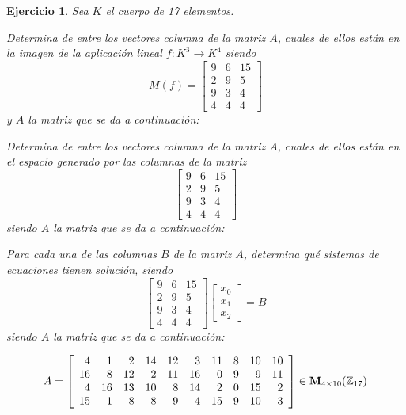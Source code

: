 \documentclass[12pt]{amsart}
\newtheorem{ejer}{Ejercicio}
\begin{document}
\begin{ejer} Sea $K$ el cuerpo de 17 elementos.
\newline
\noindent\begin{minipage}{\textwidth}
\begin{tcolorbox}[colback = green!20!white,title=Versión Núcleo]
Determina de entre los vectores columna de la matriz $A$, cuales de ellos están en la imagen de la aplicación lineal $f:K^{3} \to K^{4}$ siendo  $$ M(f) = \left[\begin{array}{rrr}
9 & 6 & 15 \\
2 & 9 & 5 \\
9 & 3 & 4 \\
4 & 4 & 4
\end{array}\right] $$ y $A$ la matriz que se da a continuación:\end{tcolorbox}
\end{minipage} \newline
\noindent\begin{minipage}{\textwidth}
\begin{tcolorbox}[colback = blue!20!white,title=Versión Anulador]
Determina de entre los vectores columna de la matriz $A$, cuales de ellos están en el espacio generado por las columnas de la matriz $$ \left[\begin{array}{rrr}
9 & 6 & 15 \\
2 & 9 & 5 \\
9 & 3 & 4 \\
4 & 4 & 4
\end{array}\right] $$ siendo $A$ la matriz que se da a continuación:\end{tcolorbox}
\end{minipage} \newline
\noindent\begin{minipage}{\textwidth} 
\begin{tcolorbox}[colback = red!20!white,title=Versión Ecuaciones Implícitas]
Para cada una de las columnas $B$ de la matriz $A$, determina qué sistemas de ecuaciones tienen solución, siendo $$ \left[\begin{array}{rrr}
9 & 6 & 15 \\
2 & 9 & 5 \\
9 & 3 & 4 \\
4 & 4 & 4
\end{array}\right] \left[\begin{array}{r}
x_{0} \\
x_{1} \\
x_{2}
\end{array}\right] = B$$ siendo $A$ la matriz que se da a continuación:
\end{tcolorbox}
\end{minipage}
\[ A = \left[\begin{array}{rrrrrrrrrr}
4 & 1 & 2 & 14 & 12 & 3 & 11 & 8 & 10 & 10 \\
16 & 8 & 12 & 2 & 11 & 16 & 0 & 9 & 9 & 11 \\
4 & 16 & 13 & 10 & 8 & 14 & 2 & 0 & 15 & 2 \\
15 & 1 & 8 & 8 & 9 & 4 & 15 & 9 & 10 & 3
\end{array}\right] \in {\bf M}_{4\times 10}({\mathbb Z}_{17})\]
\end{ejer}
\end{document}
